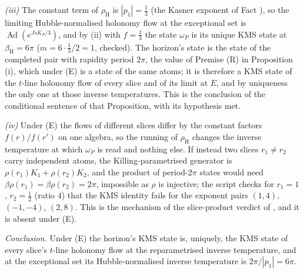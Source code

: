 \emph{(iii)} The constant term of $\rho_{\mathrm{H}}$ is $|p_{1}| = \tfrac13$ (the Kasner exponent of Fact ), so the limiting Hubble-normalised holonomy flow at the exceptional set is $\operatorname{Ad}(e^{JsK_{P}/3})$, and by (ii) with $f = \tfrac13$ the state $\omega_{P}$ is its unique KMS state at $\beta_{\mathrm{H}} = 6\pi$ ($m = 6 \cdot \tfrac13 / 2 = 1$, checked). The horizon's state is the state of the completed pair with rapidity period $2\pi$, the value of Premise (R) in Proposition (i), which under (E) is a state of the same atoms; it is therefore a KMS state of the $t$-line holonomy flow of every slice and of its limit at $E$, and by uniqueness the only one at those inverse temperatures. This is the conclusion of the conditional sentence of that Proposition, with its hypothesis met.

\emph{(iv)} Under (E) the flows of different slices differ by the constant factors $f(r)/f(r')$ on one algebra, so the running of $\rho_{\mathrm{H}}$ changes the inverse temperature at which $\omega_{P}$ is read and nothing else. If instead two slices $r_{1} \neq r_{2}$ carry independent atoms, the Killing-parametrised generator is $\rho(r_{1})K_{1} + \rho(r_{2})K_{2}$, and the product of period-$2\pi$ states would need $\beta\rho(r_{1}) = \beta\rho(r_{2}) = 2\pi$, impossible as $\rho$ is injective; the script checks for $r_{1} = 1$, $r_{2} = \tfrac12$ (ratio $4$) that the KMS identity fails for the exponent pairs $(1, 4)$, $(-1, -4)$, $(2, 8)$. This is the mechanism of the slice-product verdict of , and it is absent under (E).

\emph{Conclusion.} Under (E) the horizon's KMS state is, uniquely, the KMS state of every slice's $t$-line holonomy flow at the reparametrised inverse temperature, and at the exceptional set its Hubble-normalised inverse temperature is $2\pi/|p_{1}| = 6\pi$.

